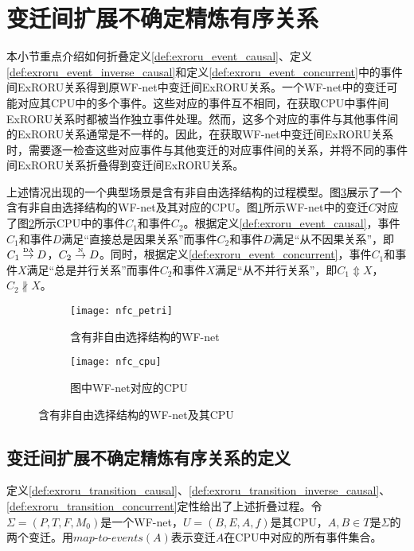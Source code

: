 \section{变迁间扩展不确定精炼有序关系}\label{sec:exroru_transition}
本小节重点介绍如何折叠定义\ref{def:exroru_event_causal}、定义\ref{def:exroru_event_inverse_causal}和定义\ref{def:exroru_event_concurrent}中的事件间ExRORU关系得到原WF-net中变迁间ExRORU关系。一个WF-net中的变迁可能对应其CPU中的多个事件。这些对应的事件互不相同，在获取CPU中事件间ExRORU关系时都被当作独立事件处理。然而，这多个对应的事件与其他事件间的ExRORU关系通常是不一样的。因此，在获取WF-net中变迁间ExRORU关系时，需要逐一检查这些对应事件与其他变迁的对应事件间的关系，并将不同的事件间ExRORU关系折叠得到变迁间ExRORU关系。

上述情况出现的一个典型场景是含有非自由选择结构的过程模型。图\ref{fig:nfc_exroru}展示了一个含有非自由选择结构的WF-net及其对应的CPU。图\ref{fig:nfc_petri}所示WF-net中的变迁$C$对应了图\ref{fig:nfc_cpu}所示CPU中的事件$C_{1}$和事件$C_{2}$。根据定义\ref{def:exroru_event_causal}，事件$C_{1}$和事件$D$满足“直接总是因果关系”而事件$C_{2}$和事件$D$满足“从不因果关系”，即$C_{1}\overset{\text{\tiny{DA}}}{\rightarrow}D$，$C_{2}\overset{\text{\tiny{N}}}{\rightarrow}D$。同时，根据定义\ref{def:exroru_event_concurrent}，事件$C_{1}$和事件$X$满足“总是并行关系”而事件$C_{2}$和事件$X$满足“从不并行关系”，即$C_{1}\Updownarrow X$，$C_{2}\nparallel X$。

\begin{figure}[htbp]
  \centering
  \begin{subfigure}[b]{0.45\textwidth}
    \centering
    \texttt{[image: nfc\_petri]}
    \caption{含有非自由选择结构的WF-net}
    \label{fig:nfc_petri}
  \end{subfigure}
  \hspace{1em}
  \begin{subfigure}[b]{0.45\textwidth}
    \centering
    \texttt{[image: nfc\_cpu]}
    \caption{图中WF-net对应的CPU}
    \label{fig:nfc_cpu}
  \end{subfigure}
  \vspace{6pt}
  \caption{含有非自由选择结构的WF-net及其CPU}
  \label{fig:nfc_exroru}
\end{figure}

\subsection{变迁间扩展不确定精炼有序关系的定义}\label{subsec:exroru_transition_def}
定义\ref{def:exroru_transition_causal}、\ref{def:exroru_transition_inverse_causal}、\ref{def:exroru_transition_concurrent}定性给出了上述折叠过程。令$\Sigma=(P,T,F,M_{0})$是一个WF-net，$U=(B,E,A,f)$是其CPU，$A,B\in T$是$\Sigma$的两个变迁。用$map$-$to$-$events(A)$表示变迁$A$在CPU中对应的所有事件集合。

